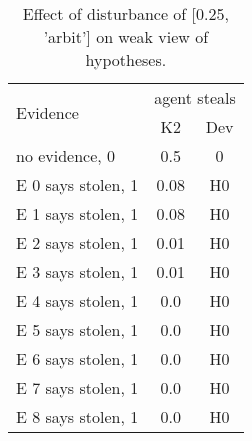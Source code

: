 \begin{table}\begin{tabular}{l|cc}\toprule\multirow{2}{*}{Evidence} & \multicolumn{2}{c}{agent steals}\\& {K2} & {Dev}\\\midrule
no evidence, 0 & \cellcolor{Bittersweet}0.5&\cellcolor{Bittersweet}0\\E 0 says stolen, 1 & \cellcolor{Bittersweet}0.08&\cellcolor{Bittersweet}H0\\E 1 says stolen, 1 & \cellcolor{Bittersweet}0.08&\cellcolor{Bittersweet}H0\\E 2 says stolen, 1 & \cellcolor{Bittersweet}0.01&\cellcolor{Bittersweet}H0\\E 3 says stolen, 1 & \cellcolor{Bittersweet}0.01&\cellcolor{Bittersweet}H0\\E 4 says stolen, 1 & \cellcolor{Bittersweet}0.0&\cellcolor{Bittersweet}H0\\E 5 says stolen, 1 & \cellcolor{Bittersweet}0.0&\cellcolor{Bittersweet}H0\\E 6 says stolen, 1 & \cellcolor{Bittersweet}0.0&\cellcolor{Bittersweet}H0\\E 7 says stolen, 1 & \cellcolor{Bittersweet}0.0&\cellcolor{Bittersweet}H0\\E 8 says stolen, 1 & \cellcolor{Bittersweet}0.0&\cellcolor{Bittersweet}H0\\\bottomrule\end{tabular}\caption{Effect of disturbance of [0.25, 'arbit'] on weak view of hypotheses.}\end{table}